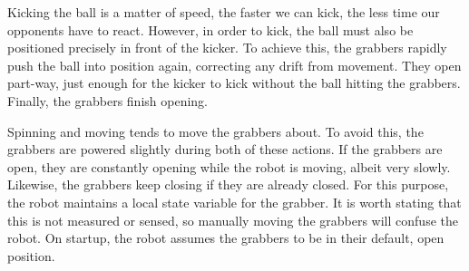 Kicking the ball is a matter of speed, the faster we can kick, the less time
our opponents have to react. However, in order to kick, the ball must also be
positioned precisely in front of the kicker. To achieve this, the grabbers
rapidly push the ball into position again, correcting any drift from movement.
They open part-way, just enough for the kicker to kick without the ball
hitting the grabbers. Finally, the grabbers finish opening.

Spinning and moving tends to move the grabbers about. To avoid this, the
grabbers are powered slightly during both of these actions. If the grabbers are
open, they are constantly opening while the robot is moving, albeit very
slowly. Likewise, the grabbers keep closing if they are already closed. For
this purpose, the robot maintains a local state variable for the grabber. It is
worth stating that this is not measured or sensed, so manually moving the
grabbers will confuse the robot. On startup, the robot assumes the grabbers to
be in their default, open position.
